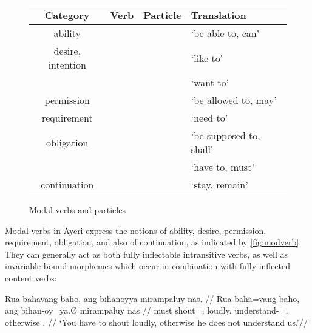\begin{figure}
\caption{Modal verbs and particles}
\begin{tabu} to \linewidth {C[3] X[2] X[2] X[4]}
\tableheaderfont\toprule
Category
	& Verb
	& Particle
	& Translation
	\\
\toprule

ability
	&  
	&  
	& `be able to, can'
	\\
	
\midrule
	
desire, intention
	&  
	&  
	& `like to'
	\\
	
	&  
	&  
	& `want to'
	\\
	
\midrule

permission
	&  
	&  
	& `be allowed to, may'
	\\
	
\midrule

requirement
	&  
	&  
	& `need to'
	\\
	
\midrule

obligation
	&  
	&  
	& `be supposed to, shall'
	\\
	
	&  
	&  
	& `have to, must'
	\\
	
\midrule
	
continuation
	&  
	&  
	& `stay, remain'
	\\

\bottomrule
\end{tabu}
\label{fig:modverb}
\end{figure}

Modal verbs in Ayeri express the notions of ability, desire, permission, 
requirement, obligation, and also of continuation, as indicated by 
\autoref{fig:modverb}. They can generally act as both fully inflectable 
intransitive verbs, as well as invariable bound morphemes which occur in 
combination with fully inflected content verbs:

\pex
\a\label{ex:modalinvar}\begingl
	\gla Rua bahavāng baho, ang bihanoyya mirampaluy nas. //
	\glb Rua baha=vāng baho, ang bihan-oy=ya.Ø mirampaluy nas //
	\glc must shout=\Ssg{}.\Aarg{} loudly, \AgtT{} 
		understand-\Neg{}=\TsgM{}.\Top{} otherwise \Fpl{}.\Parg{} //
	\glft `You have to shout loudly, otherwise he does not understand 
		us.'//
\endgl

